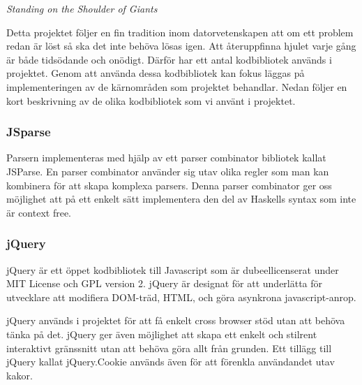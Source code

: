 \emph{Standing on the Shoulder of Giants}

Detta projektet följer en fin tradition inom datorvetenskapen att om ett problem redan är löst så ska det inte behöva lösas igen. Att återuppfinna hjulet varje gång är både tidsödande och onödigt. 
Därför har ett antal kodbibliotek används i projektet. 
Genom att använda dessa kodbibliotek kan fokus läggas på implementeringen av de kärnområden som projektet behandlar.
Nedan följer en kort beskrivning av de olika kodbibliotek som vi använt i projektet.

 \subsubsection{JSparse}  

Parsern implementeras med hjälp av ett parser combinator bibliotek kallat JSParse.
En parser combinator använder sig utav olika regler som man kan kombinera för att skapa komplexa parsers. 
Denna parser combinator ger oss möjlighet att på ett enkelt sätt
implementera den del av  Haskells syntax som inte är context free.

\subsubsection{jQuery} 

jQuery är ett öppet kodbibliotek till Javascript som är dubeellicenserat under MIT License och GPL version 2.  
jQuery är designat för att underlätta för utvecklare att modifiera DOM-träd, HTML, och göra asynkrona javascript-anrop.

jQuery används i projektet för att få enkelt cross browser stöd utan att behöva tänka på det. 
jQuery ger även möjlighet att skapa ett enkelt och stilrent interaktivt gränssnitt utan att behöva göra allt från grunden.
Ett tillägg till jQuery kallat jQuery.Cookie används även för att förenkla användandet utav kakor.

